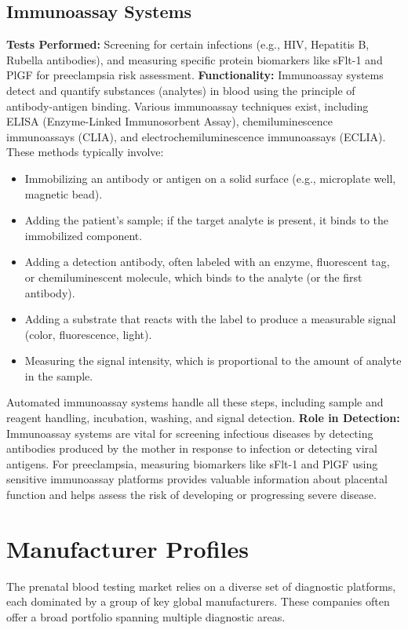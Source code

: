 \documentclass{article}
\begin{document}
\subsection{Immunoassay Systems}
\textbf{Tests Performed:} Screening for certain infections (e.g., HIV, Hepatitis B, Rubella antibodies), and measuring specific protein biomarkers like sFlt-1 and PlGF for preeclampsia risk assessment.
\textbf{Functionality:} Immunoassay systems detect and quantify substances (analytes) in blood using the principle of antibody-antigen binding. Various immunoassay techniques exist, including ELISA (Enzyme-Linked Immunosorbent Assay), chemiluminescence immunoassays (CLIA), and electrochemiluminescence immunoassays (ECLIA). These methods typically involve:
\begin{itemize}
    \item Immobilizing an antibody or antigen on a solid surface (e.g., microplate well, magnetic bead).
    \item Adding the patient's sample; if the target analyte is present, it binds to the immobilized component.
    \item Adding a detection antibody, often labeled with an enzyme, fluorescent tag, or chemiluminescent molecule, which binds to the analyte (or the first antibody).
    \item Adding a substrate that reacts with the label to produce a measurable signal (color, fluorescence, light).
    \item Measuring the signal intensity, which is proportional to the amount of analyte in the sample.
\end{itemize}
Automated immunoassay systems handle all these steps, including sample and reagent handling, incubation, washing, and signal detection.
\textbf{Role in Detection:} Immunoassay systems are vital for screening infectious diseases by detecting antibodies produced by the mother in response to infection or detecting viral antigens. For preeclampsia, measuring biomarkers like sFlt-1 and PlGF using sensitive immunoassay platforms provides valuable information about placental function and helps assess the risk of developing or progressing severe disease.

\section{Manufacturer Profiles}
The prenatal blood testing market relies on a diverse set of diagnostic platforms, each dominated by a group of key global manufacturers. These companies often offer a broad portfolio spanning multiple diagnostic areas.
\end{document}
